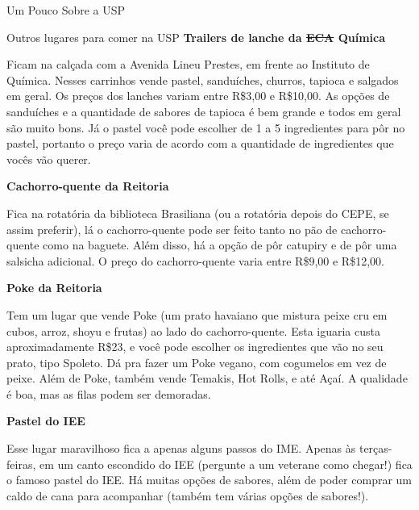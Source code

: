 \begin{secao}{Um Pouco Sobre a USP}
\begin{subsecao}{Outros lugares para comer na USP}
{\bf Trailers de lanche da \sout{ECA} Química}

Ficam na calçada com a Avenida Lineu Prestes, em frente ao Instituto de
Química. Nesses carrinhos vende pastel, sanduíches, churros, tapioca e salgados
em geral. Os preços dos lanches variam entre R\$3,00 e R\$10,00. As opções de
sanduíches e a quantidade de sabores de tapioca é bem grande e todos em geral
são muito bons. Já o pastel você pode escolher de 1 a 5 ingredientes para pôr
no pastel, portanto o preço varia de acordo com a quantidade de ingredientes que
vocês vão querer.

{\bf Cachorro-quente da Reitoria}

Fica na rotatória da biblioteca Brasiliana (ou a rotatória depois do CEPE, se assim preferir),
lá o cachorro-quente pode ser feito tanto no pão de cachorro-quente como na baguete. Além disso,
há a opção de pôr catupiry e de pôr uma salsicha adicional. O preço do cachorro-quente varia
entre R\$9,00 e R\$12,00.

{\bf Poke da Reitoria}

Tem um lugar que vende Poke (um prato havaiano que mistura peixe cru em cubos,
arroz, shoyu e frutas) ao lado do cachorro-quente. Esta iguaria custa
aproximadamente R\$23, e você pode escolher os ingredientes que vão no seu prato,
tipo Spoleto. Dá pra fazer um Poke vegano, com cogumelos em vez de peixe. Além de
Poke, também vende Temakis, Hot Rolls, e até Açaí. A qualidade é boa, mas as filas
podem ser demoradas.

{\bf Pastel do IEE}

Esse lugar maravilhoso fica a apenas alguns passos do IME. Apenas às terças-feiras,
em um canto escondido do IEE (pergunte a um veterane como chegar!) fica o famoso pastel do IEE.
Há muitas opções de sabores, além de poder comprar um caldo de cana para acompanhar (também tem várias opções de sabores!).

\end{subsecao}

\end{secao}
